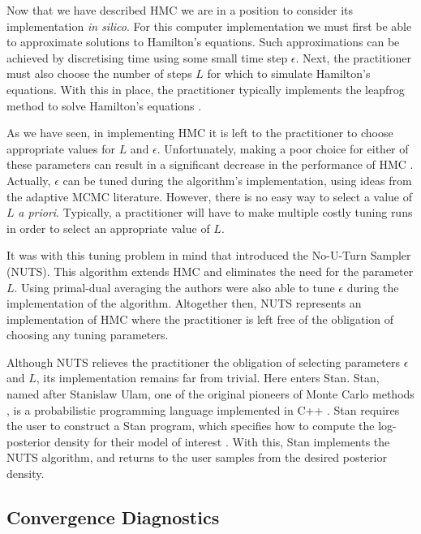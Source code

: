 Now that we have described HMC we are in a position to consider its implementation
\emph{in silico}. For this computer implementation we must first be able to approximate
solutions to Hamilton's equations. Such approximations can be achieved by discretising
time using some small time step $\epsilon$. Next, the practitioner must also choose the
number of steps $L$ for which to simulate Hamilton's equations. With this in place, the
practitioner typically implements the leapfrog method to solve Hamilton's equations
\parencite{neal11}. 

As we have seen, in implementing HMC it is left to the practitioner to choose appropriate
values for $L$ and $\epsilon$. Unfortunately, making a poor choice for either of these
parameters can result in a significant decrease in the performance of HMC
\parencite{hoffman14}. Actually, $\epsilon$ can be tuned during the algorithm's
implementation, using ideas from the adaptive MCMC literature. However, there is no easy
way to select a value of $L$ \emph{a priori}. Typically, a practitioner will have to make
multiple costly tuning runs in order to select an appropriate value of $L$.

It was with this tuning problem in mind that \textcite{hoffman14} introduced the No-U-Turn
Sampler (NUTS). This algorithm extends HMC and eliminates the need for the parameter $L$.
Using primal-dual averaging the authors were also able to tune $\epsilon$ during the
implementation of the algorithm. Altogether then, NUTS represents an implementation of HMC
where the practitioner is left free of the obligation of choosing any tuning parameters.

Although NUTS relieves the practitioner the obligation of selecting parameters $\epsilon$
and $L$, its implementation remains far from trivial. Here enters Stan. Stan, named after
Stanislaw Ulam, one of the original pioneers of Monte Carlo methods
\parencite{metropolis49}, is a probabilistic programming language implemented in C++
\parencite{gelman15}. Stan requires the user to construct a Stan program, which specifies
how to compute the log-posterior density for their model of interest
\parencite{stanteam15}. With this, Stan implements the NUTS algorithm, and returns to the
user samples from the desired posterior density.

\subsection{Convergence Diagnostics}
\label{ssec:convergence_diagnostics}

